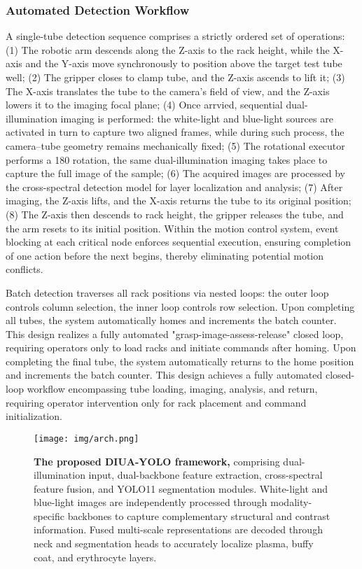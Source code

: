 \documentclass[journal,twoside,web]{ieeecolor}
\begin{document}
\subsubsection{Automated Detection Workflow} A single-tube detection sequence comprises a strictly ordered set of operations: (1) The robotic arm descends along the Z-axis to the rack height, while the X-axis and the Y-axis move synchronously to position above the target test tube well; (2) The gripper closes to clamp tube, and the Z-axis ascends to lift it; (3) The X-axis translates the tube to the camera’s field of view, and the Z-axis lowers it to the imaging focal plane; (4) Once arrvied, sequential dual-illumination imaging is performed: the white-light and blue-light sources are activated in turn to capture two aligned frames, while during such process, the camera–tube geometry remains mechanically fixed; (5) The rotational executor performs a 180 \degree rotation, the same dual-illumination imaging takes place to capture the full image of the sample; (6) The acquired images are processed by the cross-spectral detection model for layer localization and analysis; (7) After imaging, the Z-axis lifts, and the X-axis returns the tube to its original position; (8) The Z-axis then descends to rack height, the gripper releases the tube, and the arm resets to its initial position. Within the motion control system, event blocking at each critical node enforces sequential execution, ensuring completion of one action before the next begins, thereby eliminating potential motion conflicts. 

Batch detection traverses all rack positions via nested loops: the outer loop controls column selection, the inner loop controls row selection. Upon completing all tubes, the system automatically homes and increments the batch counter. This design realizes a fully automated "grasp-image-assess-release" closed loop, requiring operators only to load racks and initiate commands after homing. Upon completing the final tube, the system automatically returns to the home position and increments the batch counter. This design achieves a fully automated closed-loop workflow encompassing tube loading, imaging, analysis, and return, requiring operator intervention only for rack placement and command initialization.

\begin{figure*}[!t]
\centering
\texttt{[image: img/arch.png]}
\caption{\textbf{The proposed DIUA-YOLO framework,} comprising dual-illumination input, dual-backbone feature extraction, cross-spectral feature fusion, and YOLO11 segmentation modules. 
White-light and blue-light images are independently processed through modality-specific backbones to capture complementary structural and contrast information. 
Fused multi-scale representations are decoded through neck and segmentation heads to accurately localize plasma, buffy coat, and erythrocyte layers.}
\label{fig:architecture}
\end{figure*}
\end{document}
